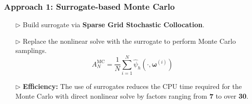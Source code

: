 \documentclass{beamer}
\begin{document}
\begin{frame}[t]
    \frametitle{Approach 1: Surrogate-based Monte Carlo}
\begin{itemize}[leftmargin=5pt] 


\item[$\triangleright$] Build surrogate via \textcolor{myblue3}{\bf Sparse Grid Stochastic Collocation}.
\item[$\triangleright$] \textcolor{myblue3}{Replace the nonlinear solve with the surrogate to perform Monte Carlo samplings.}
%
{\fontsize{7}{7}\selectfont
\begin{equation*}
\label{eq:MC_estimator}
    A^{\text{MC}}_{N} = \frac{1}{N}\sum_{i=1}^{N} \widehat \psi_{h}\left(\cdot, \boldsymbol{\omega}^{(i)}\right)
\end{equation*}
}
%
\item[$\triangleright$] \textcolor{myblue3}{\bf Efficiency:} {\footnotesize The use of surrogates reduces the CPU time required for the Monte Carlo with direct nonlinear solve by factors ranging from {\bf 7} to over {\bf 30}.}

    \vspace{-2mm}
    \begin{table}[ht]
    \centering
        \begin{threeparttable}
\end{threeparttable}
\end{table}
\end{itemize}
\end{frame}
\end{document}
